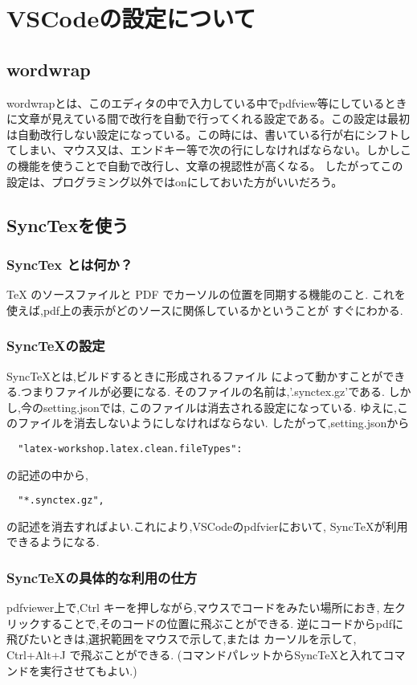 \documentclass{ltjsarticle}
\begin{document}
\section{VSCodeの設定について}
\subsection{wordwrap}
wordwrapとは、このエディタの中で入力している中でpdfview等にしているときに文章が見えている間で改行を自動で行ってくれる設定である。この設定は最初は自動改行しない設定になっている。この時には、書いている行が右にシフトしてしまい、マウス又は、エンドキー等で次の行にしなければならない。しかしこの機能を使うことで自動で改行し、文章の視認性が高くなる。
したがってこの設定は、プログラミング以外ではonにしておいた方がいいだろう。
\subsection{SyncTexを使う}
\subsubsection*{SyncTex とは何か？}
TeX のソースファイルと PDF でカーソルの位置を同期する機能のこと.
これを使えば,pdf上の表示がどのソースに関係しているかということが
すぐにわかる.
\subsubsection*{SyncTeXの設定}
SyncTeXとは,ビルドするときに形成されるファイル
によって動かすことができる.つまりファイルが必要になる.
そのファイルの名前は,'.synctex.gz'である.
しかし,今のsetting.jsonでは,
このファイルは消去される設定になっている.
ゆえに,このファイルを消去しないようにしなければならない.
したがって,setting.jsonから
\begin{verbatim}
  "latex-workshop.latex.clean.fileTypes":
\end{verbatim}
の記述の中から,
\begin{verbatim}
  "*.synctex.gz",
\end{verbatim}
の記述を消去すればよい.これにより,VSCodeのpdfvierにおいて,
SyncTeXが利用できるようになる.
\subsubsection*{SyncTeXの具体的な利用の仕方}
pdfviewer上で,Ctrl キーを押しながら,マウスでコードをみたい場所におき,
左クリックすることで,そのコードの位置に飛ぶことができる.
逆にコードからpdfに飛びたいときは,選択範囲をマウスで示して,または
カーソルを示して, Ctrl+Alt+J で飛ぶことができる.
(コマンドパレットからSyncTeXと入れてコマンドを実行させてもよい.)
\end{document}
